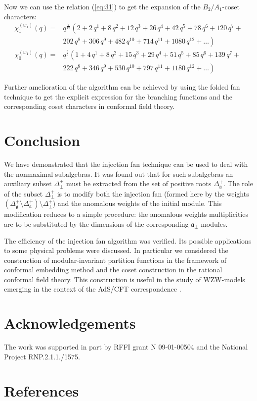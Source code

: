 \documentclass[12pt]{iopart}
\theoremstyle{definition}
\theoremstyle{definition}
\theoremstyle{definition}
\theoremstyle{definition}
\begin{document}
Now we can use the relation (\ref{eq:31}) to get the expansion of the $B_2/A_1$-coset characters:
\begin{equation*}
  \label{eq:35}
  \begin{array}{cc}
    \chi^{(w_1)}_{1}(q)= & q^{\frac{7}{12}}\left( 2+2\,q^{1}+8\,q^{2}+12\,q^{3}+26\,q^{4}+42\,q^{5}+78\,q^{6}+120\,q^{7}+\right. \\
    & \left. 202\,q^{8}+306\,q^{9}+482\,q^{10}+714\,q^{11}+1080\,q^{12}+\dots \right)\\
    \chi^{(w_1)}_{0}(q) = & q^{\frac{5}{6}}\left(1 + 4\,q^{1}+ 8\,q^{2}+ 15\,q^{3}+ 29\,q^{4}+ 51\,q^{5}+ 85\,q^{6}+ 139\,q^{7}+\right. \\
    &\left. 222\,q^{8}+ 346\,q^{9}+ 530\,q^{10}+ 797\,q^{11}+ 1180\,q^{12}+\dots\right)
  \end{array}
\end{equation*}

Further amelioration of the algorithm can be achieved by using
the folded fan technique \cite{il2010folded} to get the explicit expression
for the branching functions and the corresponding coset characters in conformal field theory.

\section{Conclusion}
\label{sec:conclusion}
We have demonstrated that the injection fan technique can be used to deal with the nonmaximal subalgebras.
It was found out that for such subalgebras an auxiliary subset $\Delta^{+}_{\bot}$ must be extracted
from the set of positive roots $\Delta_{\mathfrak{g}}^{+}$.
The role of the subset $\Delta^{+}_{\bot}$ is to modify both the injection fan (formed here by the
weights $\left(\Delta_{\mathfrak{g}}^{+} \setminus  \Delta_{\mathfrak{a}}^{+}\right) \setminus \Delta^{+}_{\bot}$)
and the anomalous weights of the initial module.
This modification reduces to a simple procedure:
the anomalous weights multiplicities are to be substituted by the dimensions of the corresponding ${\mathfrak{a}}_{\bot}$-modules.

The efficiency of the injection fan algorithm was verified.
Its possible applications to some physical problems were discussed.
In particular we considered the construction of modular-invariant partition functions
in the framework of conformal embedding method and the coset construction in the rational conformal field theory.
This construction is useful in the study of WZW-models
emerging in the context of the AdS/CFT correspondence \cite{Maldacena:2000hw,Maldacena:2000kv,Maldacena:2001km}.

\section{Acknowledgements}
The work was supported in
part by RFFI grant N 09-01-00504 and the National Project RNP.2.1.1./1575.

\section*{References}
{}

\end{document}
